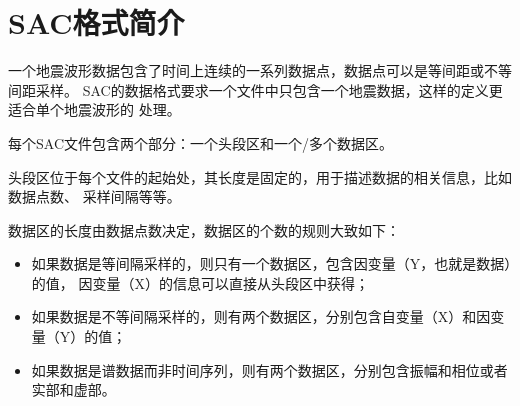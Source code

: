 \section{SAC格式简介}
一个地震波形数据包含了时间上连续的一系列数据点，数据点可以是等间距或不等间距采样。
SAC的数据格式要求一个文件中只包含一个地震数据，这样的定义更适合单个地震波形的
处理。

每个SAC文件包含两个部分：一个头段区和一个/多个数据区。

头段区位于每个文件的起始处，其长度是固定的，用于描述数据的相关信息，比如数据点数、
采样间隔等等。

数据区的长度由数据点数决定，数据区的个数的规则大致如下：
\begin{itemize}
\item 如果数据是等间隔采样的，则只有一个数据区，包含因变量（Y，也就是数据）的值，
    因变量（X）的信息可以直接从头段区中获得；
\item 如果数据是不等间隔采样的，则有两个数据区，分别包含自变量（X）和因变量（Y）的值；
\item 如果数据是谱数据而非时间序列，则有两个数据区，分别包含振幅和相位或者实部和虚部。
\end{itemize}
